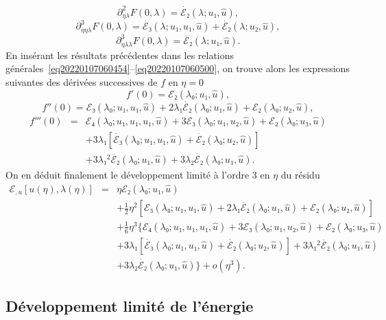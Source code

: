 \documentclass[12pt, final]{amsart}
\theoremstyle{definition}
\begin{document}
\begin{equation}
  \partial_{η  λ}^2 F(0, λ) = \dot{ℰ₂}
 (λ ; u₁, \hat{u}),
\end{equation}
\begin{equation}
  \partial_{η  η  λ}^3 F(0, λ) =
  \dot{ℰ₃}(λ ; u₁, u₁, \hat{u}) + \dot{ℰ₂}
 (λ ; u₂, \hat{u}),
\end{equation}
\begin{equation}
  \partial_{η  λ  λ}^3 F(0, λ) =
  \ddot{ℰ₂}(λ ; u₁, \hat{u}) .
\end{equation}
En insérant les résultats précédentes dans les relations générales~\eqref{eq20220107060454}--\eqref{eq20220107060500}, on trouve alors les expressions suivantes des dérivées successives de \(f\) en \(η = 0\)
\begin{equation}
  f'(0) =ℰ₂(λ₀ ; u₁, \hat{u}),
\end{equation}
\begin{equation}
  f''(0) =ℰ₃(λ₀ ; u₁, u₁, \hat{u}) + 2 λ₁
  \dot{ℰ₂}(λ₀ ; u₁, \hat{u}) +ℰ₂(λ₀ ;
  u₂, \hat{u}),
\end{equation}
\begin{eqnarray}
  f'''(0) & = & ℰ₄(λ₀ ; u₁, u₁, u₁, \hat{u}) +
  3ℰ₃(λ₀ ; u₁, u₂, \hat{u}) +ℰ₂(λ₀ ;
  u₃, \hat{u}) \nonumber\\
  &  &  + 3 λ₁  [\dot{ℰ₃}(λ₀ ; u₁, u₁,
  \hat{u}) + \dot{ℰ₂}(λ₀ ; u₂, \hat{u})] \nonumber\\
  &  &  + 3 λ₁^2  \ddot{ℰ₂}(λ₀ ; u₁,
  \hat{u}) + 3 λ₂  \dot{ℰ₂}(λ₀ ; u₁, \hat{u}) .
\end{eqnarray}
On en déduit finalement le développement limité à l'ordre 3 en \(η\) du résidu
\begin{eqnarray}
  ℰ_{, u} [u(η), λ(η)] & = & η ℰ₂
 (λ₀ ; u₁, \hat{u}) \nonumber\\
  &  &  + \tfrac{1}{2} η^2  [ℰ₃(λ₀ ; u₁, u₁,
  \hat{u}) + 2 λ₁  \dot{ℰ₂}(λ₀ ; u₁, \hat{u})
  +ℰ₂(λ₀ ; u₂, \hat{u})] \nonumber\\
  &  &  + \tfrac{1}{6} η^3  \{ ℰ₄(λ₀ ; u₁,
  u₁, u₁, \hat{u}) + 3ℰ₃(λ₀ ; u₁, u₂, \hat{u})
   +ℰ₂(λ₀ ; u₃, \hat{u}) \nonumber\\
  &  &  + 3 λ₁  [\dot{ℰ₃}(λ₀ ; u₁, u₁,
  \hat{u}) + \dot{ℰ₂}(λ₀ ; u₂, \hat{u})] + 3 λ₁^2
  \ddot{ℰ₂}(λ₀ ; u₁, \hat{u}) \nonumber\\
  &  &   + 3 λ₂  \dot{ℰ₂}(λ₀ ;
  u₁, \hat{u}) \} + o(η^3) .  \label{eq20220107080901}
\end{eqnarray}
\subsection{Développement limité de l'énergie}\label{sec:DL
energie}
\end{document}
